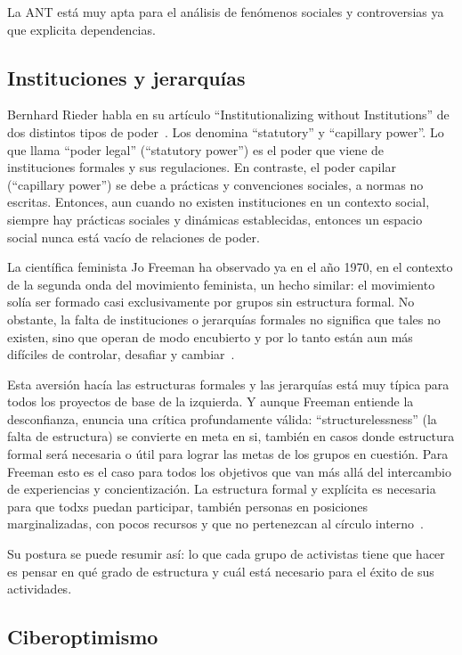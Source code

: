La ANT está muy apta para el análisis de fenómenos sociales y controversias ya que explicita dependencias.


\subsection{Instituciones y jerarquías}

Bernhard Rieder habla en su artículo ``Institutionalizing without Institutions'' de dos distintos tipos de poder~\autocite{Rieder2012}.
Los denomina ``statutory'' y ``capillary power''.
Lo que llama ``poder legal'' (``statutory power'') es el poder que viene de instituciones formales y sus regulaciones.
En contraste, el poder capilar (``capillary power'') se debe a prácticas y convenciones sociales, a normas no escritas.
Entonces, aun cuando no existen instituciones en un contexto social, siempre hay prácticas sociales y dinámicas establecidas, entonces un espacio social nunca está vacío de relaciones de poder.

La científica feminista Jo Freeman ha observado ya en el año 1970, en el contexto de la segunda onda del movimiento feminista, un hecho similar:
el movimiento solía ser formado casi exclusivamente por grupos sin estructura formal.
No obstante, la falta de instituciones o jerarquías formales no significa que tales no existen, sino que operan de modo encubierto y por lo tanto están aun más difíciles de controlar, desafiar y cambiar~\autocite{Freeman1970}.

Esta aversión hacía las estructuras formales y las jerarquías está muy típica para todos los proyectos de base de la izquierda.
Y aunque Freeman entiende la desconfianza, enuncia una crítica profundamente válida:
``structurelessness'' (la falta de estructura) se convierte en meta en si, también en casos donde estructura formal será necesaria o útil para lograr las metas de los grupos en cuestión.
Para Freeman esto es el caso para todos los objetivos que van más allá del intercambio de experiencias y concientización.
La estructura formal y explícita es necesaria para que todxs puedan participar, también personas en posiciones marginalizadas, con pocos recursos y que no pertenezcan al círculo interno~\autocite{Freeman1970}.

Su postura se puede resumir así: lo que cada grupo de activistas tiene que hacer es pensar en qué grado de estructura y cuál está necesario para el éxito de sus actividades.

\subsection{Ciberoptimismo}

